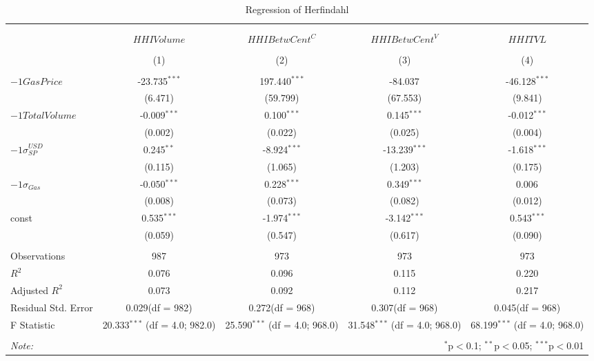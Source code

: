 \begin{table}[!htbp] \centering
  \caption{Regression of Herfindahl}
\begin{tabular}{@{\extracolsep{5pt}}lcccc}
\\[-1.8ex]\hline
\hline \\[-1.8ex]
\\[-1.8ex] & \multicolumn{1}{c}{${	 HHIVolume}$} & \multicolumn{1}{c}{${	 HHIBetwCent}^C$} & \multicolumn{1}{c}{${	 HHIBetwCent}^V$} & \multicolumn{1}{c}{${	 HHITVL}$}  \\
\\[-1.8ex] & (1) & (2) & (3) & (4) \\
\hline \\[-1.8ex]
 ${	-1 GasPrice}$ & -23.735$^{***}$ & 197.440$^{***}$ & -84.037$^{}$ & -46.128$^{***}$ \\
  & (6.471) & (59.799) & (67.553) & (9.841) \\
 ${	-1 TotalVolume}$ & -0.009$^{***}$ & 0.100$^{***}$ & 0.145$^{***}$ & -0.012$^{***}$ \\
  & (0.002) & (0.022) & (0.025) & (0.004) \\
 ${	-1 \sigma}^{USD}_{SP}$ & 0.245$^{**}$ & -8.924$^{***}$ & -13.239$^{***}$ & -1.618$^{***}$ \\
  & (0.115) & (1.065) & (1.203) & (0.175) \\
 ${	-1 \sigma}_{Gas}$ & -0.050$^{***}$ & 0.228$^{***}$ & 0.349$^{***}$ & 0.006$^{}$ \\
  & (0.008) & (0.073) & (0.082) & (0.012) \\
 const & 0.535$^{***}$ & -1.974$^{***}$ & -3.142$^{***}$ & 0.543$^{***}$ \\
  & (0.059) & (0.547) & (0.617) & (0.090) \\
\hline \\[-1.8ex]
 Observations & 987 & 973 & 973 & 973 \\
 $R^2$ & 0.076 & 0.096 & 0.115 & 0.220 \\
 Adjusted $R^2$ & 0.073 & 0.092 & 0.112 & 0.217 \\
 Residual Std. Error & 0.029(df = 982) & 0.272(df = 968) & 0.307(df = 968) & 0.045(df = 968)  \\
 F Statistic & 20.333$^{***}$ (df = 4.0; 982.0) & 25.590$^{***}$ (df = 4.0; 968.0) & 31.548$^{***}$ (df = 4.0; 968.0) & 68.199$^{***}$ (df = 4.0; 968.0) \\
\hline
\hline \\[-1.8ex]
\textit{Note:} & \multicolumn{4}{r}{$^{*}$p$<$0.1; $^{**}$p$<$0.05; $^{***}$p$<$0.01} \\
\end{tabular}
\end{table}